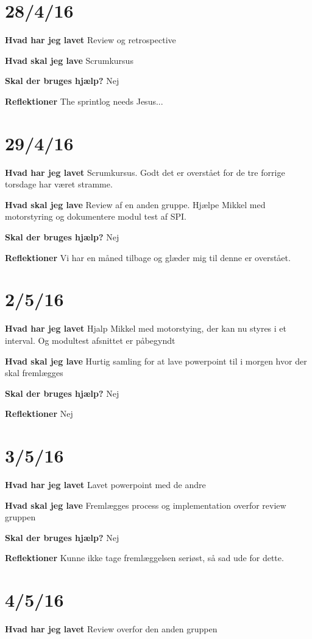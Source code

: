 \documentclass{article}
\begin{document}
	\section{28/4/16}
	\textbf{Hvad har jeg lavet}
	Review og retrospective
	
	\textbf{Hvad skal jeg lave}
	Scrumkursus
	
	\textbf{Skal der bruges hjælp?}
	Nej
	
	
	\textbf{Reflektioner}
	The sprintlog needs Jesus...
	
	\section{29/4/16}
	\textbf{Hvad har jeg lavet}
	Scrumkursus. Godt det er overstået for de tre forrige torsdage har været stramme.
	
	\textbf{Hvad skal jeg lave}
	Review af en anden gruppe. Hjælpe Mikkel med motorstyring og dokumentere modul test af SPI.
	
	\textbf{Skal der bruges hjælp?}
	Nej
	
	
	\textbf{Reflektioner}
	Vi har en måned tilbage og glæder mig til denne er overstået.
	
	\section{2/5/16}
	\textbf{Hvad har jeg lavet}
	Hjalp Mikkel med motorstying, der kan nu styres i et interval. Og modultest afsnittet er påbegyndt
	
	\textbf{Hvad skal jeg lave}
	Hurtig samling for at lave powerpoint til i morgen hvor der skal fremlægges
	
	\textbf{Skal der bruges hjælp?}
	Nej
	
	
	\textbf{Reflektioner}
	Nej
	
	\section{3/5/16}
	\textbf{Hvad har jeg lavet}
	Lavet powerpoint med de andre
	
	\textbf{Hvad skal jeg lave}
	Fremlægges process og implementation overfor review gruppen
	
	\textbf{Skal der bruges hjælp?}
	Nej
	
	
	\textbf{Reflektioner}
	Kunne ikke tage fremlæggelsen seriøst, så sad ude for dette. 
	
	
	\section{4/5/16}
	\textbf{Hvad har jeg lavet}
	Review overfor den anden gruppen
	
\end{document}
